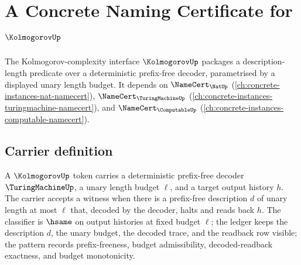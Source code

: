 \chapter{A Concrete Naming Certificate for $\KolmogorovUp$}
\label{ch:concrete-instances-kolmogorov-namecert}

The Kolmogorov-complexity interface $\KolmogorovUp$ packages a description-length predicate over a deterministic prefix-free decoder, parametrised by a displayed unary length budget. It depends on $\NameCert_{\NatUp}$ (\autoref{ch:concrete-instances-nat-namecert}), $\NameCert_{\TuringMachineUp}$ (\autoref{ch:concrete-instances-turingmachine-namecert}), and $\NameCert_{\ComputableUp}$ (\autoref{ch:concrete-instances-computable-namecert}).

\section{Carrier definition}
\label{sec:kolmogorov-carrier}

A $\KolmogorovUp$ token carries a deterministic prefix-free decoder $\TuringMachineUp$, a unary length budget $\ell$, and a target output history $h$. The carrier accepts a witness when there is a prefix-free description $d$ of unary length at most $\ell$ that, decoded by the decoder, halts and reads back $h$. The classifier is $\hsame$ on output histories at fixed budget $\ell$; the ledger keeps the description $d$, the unary budget, the decoded trace, and the readback row visible; the pattern records prefix-freeness, budget admissibility, decoded-readback exactness, and budget monotonicity.

